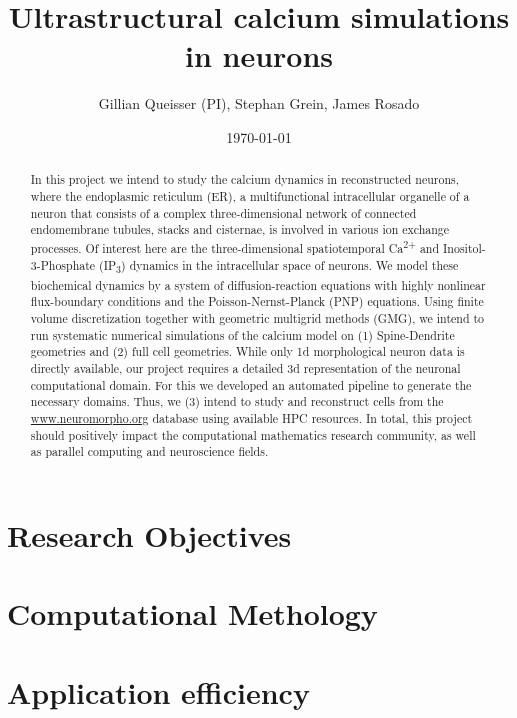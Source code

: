 \documentclass[a4paper, 11pt, notitlepage]{nsf}
\author{Gillian Queisser (PI), Stephan Grein, James Rosado}
\title{Ultrastructural calcium simulations in neurons}
\date{\today}
\begin{document}

\maketitle
\begin{abstract}
In this project we intend to study the calcium dynamics in reconstructed neurons, where the endoplasmic reticulum (ER), a multifunctional intracellular organelle of a neuron that consists of a complex three-dimensional network of connected endomembrane tubules, stacks and cisternae, is involved in various ion exchange processes. Of interest here are the three-dimensional spatiotemporal Ca\textsuperscript{2+} and Inositol-3-Phosphate (IP\textsubscript{3}) dynamics in the intracellular space of neurons. We model these biochemical dynamics by a system of diffusion-reaction equations with highly nonlinear flux-boundary conditions and the Poisson-Nernst-Planck (PNP) equations. Using finite volume discretization together with geometric multigrid methods (GMG), we intend to run systematic numerical simulations of the calcium model on (1) Spine-Dendrite geometries and (2) full cell geometries. While only 1d morphological neuron data is directly available, our project requires a detailed 3d representation of the neuronal computational domain. For this we developed an automated pipeline to generate the necessary domains. Thus, we (3) intend to study and reconstruct cells from the \url{www.neuromorpho.org} database using available HPC resources. In total, this project should positively impact the computational mathematics research community, as well as parallel computing and neuroscience fields.
\end{abstract}


\section{Research Objectives}

%

\section{Computational Methology}


\section{Application efficiency}

% 
\end{document}

